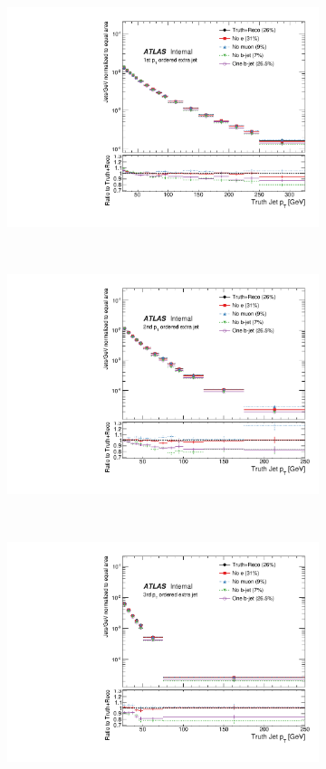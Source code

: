 \begin{figure}
\centering
\begin{subfigure}[]{0.33\textwidth}
\includegraphics[width=\textwidth]{fig/TruthNotReco/TruthPtJet0.pdf}
\end{subfigure}
~
\begin{subfigure}[]{0.33\textwidth}
\includegraphics[width=\textwidth]{fig/TruthNotReco/TruthPtJet1.pdf}
\end{subfigure}
\\
\begin{subfigure}[]{0.33\textwidth}
\includegraphics[width=\textwidth]{fig/TruthNotReco/TruthPtJet2.pdf}

\end{subfigure}
\end{figure}
